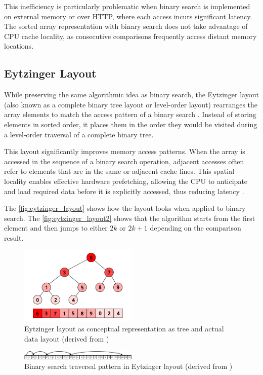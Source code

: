 This inefficiency is particularly problematic when binary search is implemented on external memory or over HTTP, where each access incurs significant latency. The sorted array representation with binary search does not take advantage of CPU cache locality, as consecutive comparisons frequently access distant memory locations.

\subsection{Eytzinger Layout}
\label{tb:eytzinger_layout}

While preserving the same algorithmic idea as binary search, the Eytzinger layout (also known as a complete binary tree layout or level-order layout) rearranges the array elements to match the access pattern of a binary search \citep{binary_search}. Instead of storing elements in sorted order, it places them in the order they would be visited during a level-order traversal of a complete binary tree.

This layout significantly improves memory access patterns. When the array is accessed in the sequence of a binary search operation, adjacent accesses often refer to elements that are in the same or adjacent cache lines. This spatial locality enables effective hardware prefetching, allowing the CPU to anticipate and load required data before it is explicitly accessed, thus reducing latency \citep{binary_search}.

The \autoref{fig:eytzinger_layout} shows how the layout looks when applied to binary search. The \autoref{fig:eytzinger_layout2} shows that the algorithm starts from the first element and then jumps to either $2k$ or $2k+1$ depending on the comparison result.

\begin{figure}[ht]
  \centering
  \includegraphics[width=0.5\textwidth]{figs/related_work_theoretical_bg/eytzinger_layout.png}
  \caption{Eytzinger layout as conceptual representation as tree and actual data layout (derived from \citet{binary_search})}
  \label{fig:eytzinger_layout}
\end{figure}
\begin{figure}[ht]
  \centering
  \includegraphics[width=0.5\textwidth]{figs/related_work_theoretical_bg/eytzinger_layout2.png}
  \caption{Binary search traversal pattern in Eytzinger layout (derived from \citet{binary_search})}
  \label{fig:eytzinger_layout2}
\end{figure}

